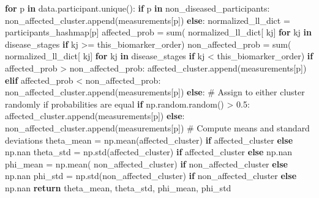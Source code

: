 \documentclass[
  letterpaper,
  DIV=11,
  numbers=noendperiod]{scrreprt}
\newenvironment{Shaded}{\begin{snugshade}}{\end{snugshade}}
\newcommand{\BuiltInTok}[1]{\textcolor[rgb]{0.00,0.23,0.31}{#1}}
\newcommand{\CommentTok}[1]{\textcolor[rgb]{0.37,0.37,0.37}{#1}}
\newcommand{\ControlFlowTok}[1]{\textcolor[rgb]{0.00,0.23,0.31}{\textbf{#1}}}
\newcommand{\FloatTok}[1]{\textcolor[rgb]{0.68,0.00,0.00}{#1}}
\newcommand{\KeywordTok}[1]{\textcolor[rgb]{0.00,0.23,0.31}{\textbf{#1}}}
\newcommand{\NormalTok}[1]{\textcolor[rgb]{0.00,0.23,0.31}{#1}}
\newcommand{\OperatorTok}[1]{\textcolor[rgb]{0.37,0.37,0.37}{#1}}
\begin{document}
\begin{Shaded}
\begin{Highlighting}[]
    \ControlFlowTok{for}\NormalTok{ p }\KeywordTok{in}\NormalTok{ data.participant.unique():}
        \ControlFlowTok{if}\NormalTok{ p }\KeywordTok{in}\NormalTok{ non\_diseased\_participants:}
\NormalTok{            non\_affected\_cluster.append(measurements[p])}
        \ControlFlowTok{else}\NormalTok{:}
\NormalTok{            normalized\_ll\_dict }\OperatorTok{=}\NormalTok{ participants\_hashmap[p]}
\NormalTok{            affected\_prob }\OperatorTok{=} \BuiltInTok{sum}\NormalTok{(}
\NormalTok{                normalized\_ll\_dict[}
\NormalTok{                    kj] }\ControlFlowTok{for}\NormalTok{ kj }\KeywordTok{in}\NormalTok{ disease\_stages }\ControlFlowTok{if}\NormalTok{ kj }\OperatorTok{\textgreater{}=}\NormalTok{ this\_biomarker\_order)}
\NormalTok{            non\_affected\_prob }\OperatorTok{=} \BuiltInTok{sum}\NormalTok{(}
\NormalTok{                normalized\_ll\_dict[}
\NormalTok{                    kj] }\ControlFlowTok{for}\NormalTok{ kj }\KeywordTok{in}\NormalTok{ disease\_stages }\ControlFlowTok{if}\NormalTok{ kj }\OperatorTok{\textless{}}\NormalTok{ this\_biomarker\_order)}
            \ControlFlowTok{if}\NormalTok{ affected\_prob }\OperatorTok{\textgreater{}}\NormalTok{ non\_affected\_prob:}
\NormalTok{                    affected\_cluster.append(measurements[p])}
            \ControlFlowTok{elif}\NormalTok{ affected\_prob }\OperatorTok{\textless{}}\NormalTok{ non\_affected\_prob:}
\NormalTok{                non\_affected\_cluster.append(measurements[p])}
            \ControlFlowTok{else}\NormalTok{:}
                \CommentTok{\# Assign to either cluster randomly if probabilities are equal}
                \ControlFlowTok{if}\NormalTok{ np.random.random() }\OperatorTok{\textgreater{}} \FloatTok{0.5}\NormalTok{:}
\NormalTok{                    affected\_cluster.append(measurements[p])}
                \ControlFlowTok{else}\NormalTok{:}
\NormalTok{                    non\_affected\_cluster.append(measurements[p])}
    \CommentTok{\# Compute means and standard deviations}
\NormalTok{    theta\_mean }\OperatorTok{=}\NormalTok{ np.mean(affected\_cluster) }\ControlFlowTok{if}\NormalTok{ affected\_cluster }\ControlFlowTok{else}\NormalTok{ np.nan}
\NormalTok{    theta\_std }\OperatorTok{=}\NormalTok{ np.std(affected\_cluster) }\ControlFlowTok{if}\NormalTok{ affected\_cluster }\ControlFlowTok{else}\NormalTok{ np.nan}
\NormalTok{    phi\_mean }\OperatorTok{=}\NormalTok{ np.mean(}
\NormalTok{        non\_affected\_cluster) }\ControlFlowTok{if}\NormalTok{ non\_affected\_cluster }\ControlFlowTok{else}\NormalTok{ np.nan}
\NormalTok{    phi\_std }\OperatorTok{=}\NormalTok{ np.std(non\_affected\_cluster) }\ControlFlowTok{if}\NormalTok{ non\_affected\_cluster }\ControlFlowTok{else}\NormalTok{ np.nan}
    \ControlFlowTok{return}\NormalTok{ theta\_mean, theta\_std, phi\_mean, phi\_std}


\end{Highlighting}
\end{Shaded}
\end{document}
